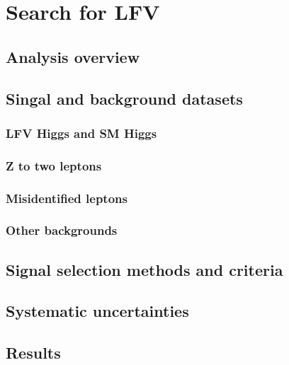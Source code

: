 \chapter{Search for LFV}
\section{Analysis overview}
\section{Singal and background datasets}
\subsection{LFV Higgs and SM Higgs}
\subsection{Z to two leptons}
\subsection{Misidentified leptons}
\subsection{Other backgrounds}
\section{Signal selection methods and criteria}
\section{Systematic uncertainties}
\section{Results}

